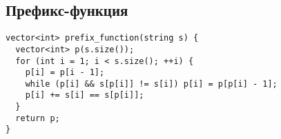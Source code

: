 \subsection{Префикс-функция}
\begin{lstlisting}
vector<int> prefix_function(string s) {
  vector<int> p(s.size());
  for (int i = 1; i < s.size(); ++i) {
    p[i] = p[i - 1];
    while (p[i] && s[p[i]] != s[i]) p[i] = p[p[i] - 1];
    p[i] += s[i] == s[p[i]];
  }
  return p;
}
\end{lstlisting}
